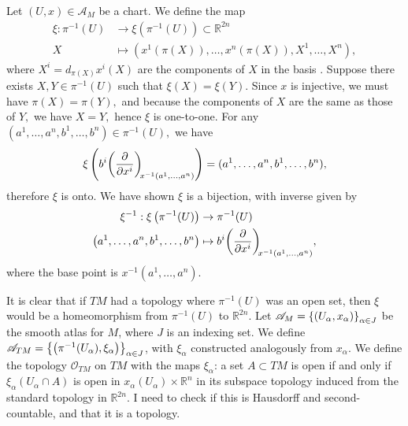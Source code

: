 Let \((U, x) \in \mathscr{A}_M\) be a chart. We define the map
\begin{align*}
    \xi : \pi^{-1}(U) &\to \xi\left(\pi^{-1}(U)\right) \subset \mathbb{R}^{2n}\\
               X &\mapsto \left(x^1(\pi(X)), \dots, x^n(\pi(X)),X^1, \dots, X^n\right),
\end{align*}
where \(X^i = d_{\pi(X)}x^i(X)\) are the components of \(X\) in the basis . Suppose there exists \(X, Y \in \pi^{-1}(U)\) such that \(\xi(X) = \xi(Y)\). Since \(x\) is injective, we must have \(\pi(X) = \pi(Y),\) and because the components of \(X\) are the same as those of \(Y,\) we have \(X = Y,\) hence \(\xi\) is one-to-one. For any \((a^1, \dots, a^n, b^1, \dots, b^n) \in \pi^{-1}(U),\) we have
\begin{equation*}
    \xi\left(b^i \bvec{x^i}{x^{-1}(a^1, \dots, a^n)}\right) = (a^1, \dots, a^n, b^1, \dots, b^n),
\end{equation*}
therefore \(\xi\) is onto. We have shown \(\xi\) is a bijection, with inverse given by
\begin{align*}
    \xi^{-1} : \xi\left(\pi^{-1}(U)\right)&\to \pi^{-1}(U)\\
    \left(a^1, \dots, a^n, b^1, \dots, b^n\right)&\mapsto b^i\bvec{x^i}{x^{-1}(a^1, \dots, a^n)},
\end{align*}
where the base point is \(x^{-1}(a^1, \dots, a^n).\)

It is clear that if \(TM\) had a topology where \(\pi^{-1}(U)\) was an open set, then \(\xi\) would be a homeomorphism from \(\pi^{-1}(U)\) to \(\mathbb{R}^{2n}\). Let \(\mathscr{A}_M = \left\{(U_\alpha, x_\alpha)\right\}_{\alpha \in J}\) be the smooth atlas for \(M\), where \(J\) is an indexing set. We define \(\mathscr{A}_{TM} = \left\{\left(\pi^{-1}(U_\alpha), \xi_\alpha\right)\right\}_{\alpha\in J}\), with \(\xi_\alpha\) constructed analogously from \(x_\alpha\). We define the topology \(\mathcal{O}_{TM}\) on \(TM\) with the maps \(\xi_\alpha\): a set \(A \subset TM\) is open if and only if \(\xi_\alpha(U_\alpha \cap A)\) is open in \(x_\alpha(U_\alpha)\times \mathbb{R}^n\) in its subspace topology induced from the standard topology in \(\mathbb{R}^{2n}\).
{\color{Red} I need to check if this is Hausdorff and second-countable, and that it is a topology.}



